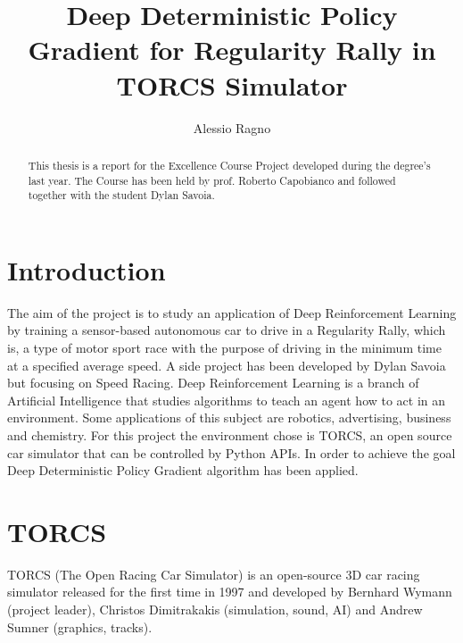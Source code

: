 \documentclass[Lau,oneside,noexaminfo]{sapthesis} %
\title{Deep Deterministic Policy Gradient for Regularity Rally in TORCS Simulator}
\author{Alessio Ragno}
\begin{document}
\frontmatter
\maketitle
\dedication{Dedicato a\\Donald Knuth}
\begin{abstract}
This thesis is a report for the Excellence Course Project developed during the degree’s last year. The Course has been held by prof. Roberto Capobianco and followed together with the student Dylan Savoia.
\end{abstract}
\tableofcontents
\mainmatter
\chapter{Introduction}
The aim of the project is to study an application of Deep Reinforcement Learning by training a sensor-based autonomous car to drive in a Regularity Rally, which is, a type of motor sport race with the purpose of driving in the minimum time at a specified average speed.\newline
A side project has been developed by Dylan Savoia but focusing on Speed Racing.\newline
Deep Reinforcement Learning is a branch of Artificial Intelligence that studies algorithms to teach an agent how to act in an environment. Some applications of this subject are robotics, advertising, business and chemistry.\newline
For this project the environment chose is TORCS, an open source car simulator that can be controlled by Python APIs.\newline
In order to achieve the goal Deep Deterministic Policy Gradient algorithm has been applied.\newline

\chapter{TORCS}
TORCS (The Open Racing Car Simulator) is an open-source 3D car racing simulator released for the first time in 1997 and developed by Bernhard Wymann (project leader), Christos Dimitrakakis (simulation, sound, AI) and Andrew Sumner (graphics, tracks).
\end{document}
